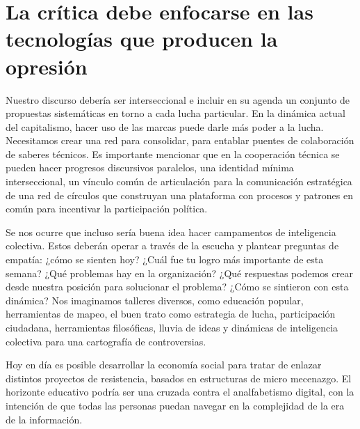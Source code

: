 \section{La crítica debe enfocarse en las tecnologías que producen la opresión}
\label{sec:critica}

Nuestro discurso debería ser interseccional e incluir en su agenda un conjunto de propuestas sistemáticas en torno a cada lucha particular. En la dinámica actual del capitalismo, hacer uso de las marcas puede darle más poder a la lucha. Necesitamos crear una red para consolidar, para entablar puentes de colaboración de saberes técnicos. Es importante mencionar que en la cooperación técnica se pueden hacer progresos discursivos paralelos, una identidad mínima interseccional, un vínculo común de articulación para la comunicación estratégica de una red de círculos que construyan una plataforma con procesos y patrones en común para incentivar la participación política.

Se nos ocurre que incluso sería buena idea hacer campamentos de inteligencia colectiva. Estos deberán operar a través de la escucha y plantear preguntas de empatía: ¿cómo se sienten hoy? ¿Cuál fue tu logro más importante de esta semana? ¿Qué problemas hay en la organización? ¿Qué respuestas podemos crear desde nuestra posición para solucionar el problema? ¿Cómo se sintieron con esta dinámica? Nos imaginamos talleres diversos, como educación popular, herramientas de mapeo, el buen trato como estrategia de lucha, participación ciudadana, herramientas filosóficas, lluvia de ideas y dinámicas de inteligencia colectiva para una cartografía de controversias.

Hoy en día es posible desarrollar la economía social para tratar de enlazar distintos proyectos de resistencia, basados en estructuras de micro mecenazgo. El horizonte educativo podría ser una cruzada contra el analfabetismo digital, con la intención de que todas las personas puedan navegar en la complejidad de la era de la información.
